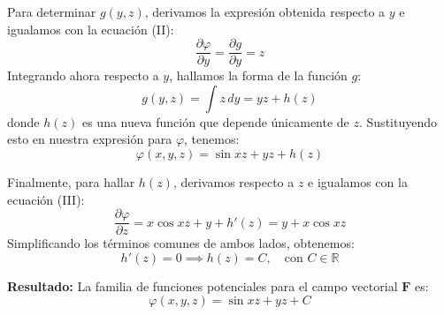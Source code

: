 Para determinar $g(y,z)$, derivamos la expresión obtenida respecto a $y$ e igualamos con la ecuación (II):
\[ \frac{\partial \varphi}{\partial y} = \frac{\partial g}{\partial y} = z \]
Integrando ahora respecto a $y$, hallamos la forma de la función $g$:
\[ g(y,z) = \int z\, dy = yz + h(z) \]
donde $h(z)$ es una nueva función que depende únicamente de $z$. Sustituyendo esto en nuestra expresión para $\varphi$, tenemos:
\[ \varphi(x,y,z) = \sin xz + yz + h(z) \]

Finalmente, para hallar $h(z)$, derivamos respecto a $z$ e igualamos con la ecuación (III):
\[ \frac{\partial \varphi}{\partial z} = x\cos xz + y + h'(z) = y + x\cos xz \]
Simplificando los términos comunes de ambos lados, obtenemos:
\[ h'(z) = 0 \implies h(z) = C, \quad \text{con } C \in \mathbb{R} \]

\noindent \textbf{Resultado:} La familia de funciones potenciales para el campo vectorial $\mathbf{F}$ es:
\[ \boxed{\varphi(x,y,z) = \sin xz + yz + C} \]



